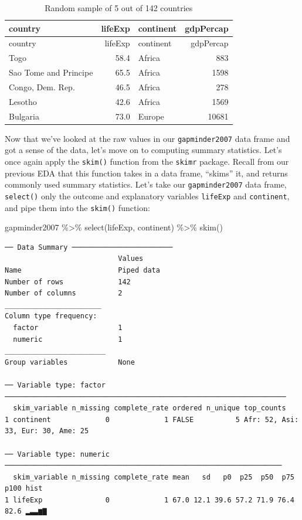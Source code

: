 \documentclass[
  letterpaper,
  DIV=11,
  numbers=noendperiod]{scrreprt}
\newenvironment{Shaded}{\begin{snugshade}}{\end{snugshade}}
\newcommand{\FunctionTok}[1]{\textcolor[rgb]{0.28,0.35,0.67}{#1}}
\newcommand{\NormalTok}[1]{\textcolor[rgb]{0.00,0.23,0.31}{#1}}
\newcommand{\SpecialCharTok}[1]{\textcolor[rgb]{0.37,0.37,0.37}{#1}}
\theoremstyle{definition}
\theoremstyle{remark}
\begin{document}
\hypertarget{tbl-model2-data-preview}{}
\begin{longtable}[]{@{}lrlr@{}}
\caption{\label{tbl-model2-data-preview}Random sample of 5 out of 142
countries}\tabularnewline
\toprule\noalign{}
country & lifeExp & continent & gdpPercap \\
\midrule\noalign{}
\endfirsthead
\toprule\noalign{}
country & lifeExp & continent & gdpPercap \\
\midrule\noalign{}
\endhead
\bottomrule\noalign{}
\endlastfoot
Togo & 58.4 & Africa & 883 \\
Sao Tome and Principe & 65.5 & Africa & 1598 \\
Congo, Dem. Rep. & 46.5 & Africa & 278 \\
Lesotho & 42.6 & Africa & 1569 \\
Bulgaria & 73.0 & Europe & 10681 \\
\end{longtable}

Now that we've looked at the raw values in our \texttt{gapminder2007}
data frame and got a sense of the data, let's move on to computing
summary statistics. Let's once again apply the \texttt{skim()} function
from the \texttt{skimr} package. Recall from our previous EDA that this
function takes in a data frame, ``skims'' it, and returns commonly used
summary statistics. Let's take our \texttt{gapminder2007} data frame,
\texttt{select()} only the outcome and explanatory variables
\texttt{lifeExp} and \texttt{continent}, and pipe them into the
\texttt{skim()} function:

\begin{Shaded}
\begin{Highlighting}[]
\NormalTok{gapminder2007 }\SpecialCharTok{\%\textgreater{}\%}
  \FunctionTok{select}\NormalTok{(lifeExp, continent) }\SpecialCharTok{\%\textgreater{}\%}
  \FunctionTok{skim}\NormalTok{()}
\end{Highlighting}
\end{Shaded}

\begin{verbatim}
── Data Summary ────────────────────────
                           Values    
Name                       Piped data
Number of rows             142       
Number of columns          2         
_______________________              
Column type frequency:               
  factor                   1         
  numeric                  1         
________________________             
Group variables            None      

── Variable type: factor ───────────────────────────────────────────────────────────────────
  skim_variable n_missing complete_rate ordered n_unique top_counts                        
1 continent             0             1 FALSE          5 Afr: 52, Asi: 33, Eur: 30, Ame: 25

── Variable type: numeric ──────────────────────────────────────────────────────────────────
  skim_variable n_missing complete_rate mean   sd   p0  p25  p50  p75 p100 hist 
1 lifeExp               0             1 67.0 12.1 39.6 57.2 71.9 76.4 82.6 ▂▃▃▆▇
\end{verbatim}
\end{document}
